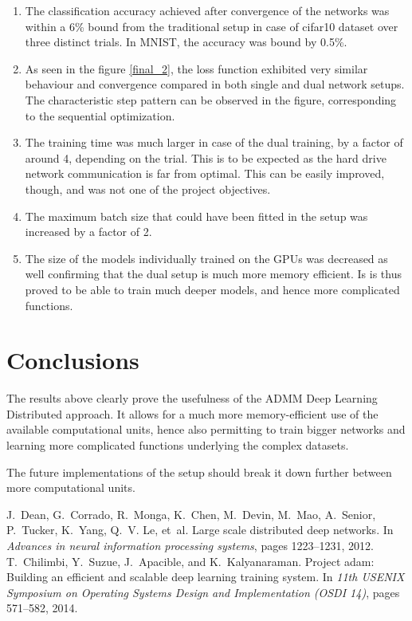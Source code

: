 \documentclass[conference]{IEEEtran}
\begin{document}
\begin{enumerate}
	\item The classification accuracy achieved after convergence of the networks was within a 6\% bound from the traditional setup in case of cifar10 dataset over three distinct trials. In MNIST, the accuracy was bound by 0.5\%.
	\item As seen in the figure \ref{final_2}, the loss function exhibited very similar behaviour and convergence compared in both single and dual network setups. The characteristic step pattern can be observed in the figure, corresponding to the sequential optimization.
	\item The training time was much larger in case of the dual training, by a factor of around 4, depending on the trial. This is to be expected as the hard drive network communication is far from optimal. This can be easily improved, though, and was not one of the project objectives.
	\item The maximum batch size that could have been fitted in the setup was increased by a factor of 2.
	\item The size of the models individually trained on the GPUs was decreased as well confirming that the dual setup is much more memory efficient. Is is thus proved to be able to train much deeper models, and hence more complicated functions.
\end{enumerate}

\section{Conclusions}

The results above clearly prove the usefulness of the ADMM Deep Learning Distributed approach. It allows for a much more memory-efficient use of the available computational units, hence also permitting to train bigger networks and learning more complicated functions underlying the complex datasets.

The future implementations of the setup should break it down further between more computational units.

                                      
\begin{thebibliography}{1}
	
J.~Dean, G.~Corrado, R.~Monga, K.~Chen, M.~Devin, M.~Mao, A.~Senior, P.~Tucker,
K.~Yang, Q.~V. Le, et~al.
\newblock Large scale distributed deep networks.
\newblock In {\em Advances in neural information processing systems}, pages
1223--1231, 2012.
T.~Chilimbi, Y.~Suzue, J.~Apacible, and K.~Kalyanaraman.
\newblock Project adam: Building an efficient and scalable deep learning
training system.
\newblock In {\em 11th USENIX Symposium on Operating Systems Design and
	Implementation (OSDI 14)}, pages 571--582, 2014.



\end{thebibliography}

\end{document}
